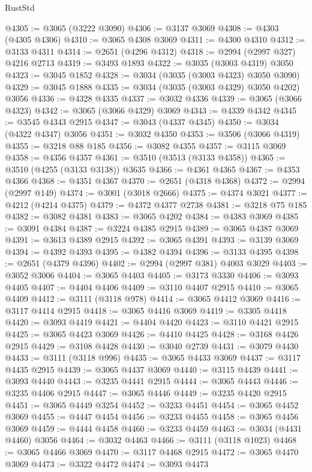 \begin{lexlean}{RustStd}
\begin{coremodule}
@4305 := @3065 (@3222 @3090)
@4306 := @3137 @3069
@4308 := @4303 (@4305 @4306)
@4310 := @3065 @4308 @3069
@4311 := @4300 @4310
@4312 := @3133 @4311
@4314 := @2651 (@4296 @4312)
@4318 := @2994 (@2997 @327) @4216 @2713
@4319 := @3493 @1893
@4322 := @3035 (@3003 @4319) @3050
@4323 := @3045 @1852
@4328 := @3034 (@3035 (@3003 @4323) @3050 @3090)
@4329 := @3045 @1888
@4335 := @3034 (@3035 (@3003 @4329) @3050 @4202) @3056
@4336 := @4328 @4335
@4337 := @3032 @4336
@4339 := @3065 (@3066 @4323)
@4342 := @3065 (@3066 @4329) @3069
@4343 := @4339 @4342
@4345 := @3545 @4343 @2915
@4347 := @3043 (@4337 @4345)
@4350 := @3034 (@4322 @4347) @3056
@4351 := @3032 @4350
@4353 := @3506 (@3066 @4319)
@4355 := @3218 @88 @185
@4356 := @3082 @4355
@4357 := @3115 @3069
@4358 := @4356 @4357
@4361 := @3510 (@3513 (@3133 @4358))
@4365 := @3510 (@4255 (@3133 @3138)) @3635
@4366 := @4361 @4365
@4367 := @4353 @4366
@4368 := @4351 @4367
@4370 := @2651 (@4318 @4368)
@4372 := @2994 (@2997 @149)
@4374 := @3001 (@3018 @2666)
@4375 := @4374 @3021
@4377 := @4212 (@4214 @4375)
@4379 := @4372 @4377 @2738
@4381 := @3218 @75 @185
@4382 := @3082 @4381
@4383 := @3065 @4202
@4384 := @4383 @3069
@4385 := @3091 @4384
@4387 := @3224 @4385 @2915
@4389 := @3065 @4387 @3069
@4391 := @3613 @4389 @2915
@4392 := @3065 @4391
@4393 := @3139 @3069
@4394 := @4392 @4393
@4395 := @4382 @4394
@4396 := @3133 @4395
@4398 := @2651 (@4379 @4396)
@4402 := @2994 (@2997 @381) @4003 @3029
@4403 := @3052 @3006
@4404 := @3065 @4403
@4405 := @3173 @3330
@4406 := @3093 @4405
@4407 := @4404 @4406
@4409 := @3110 @4407 @2915
@4410 := @3065 @4409
@4412 := @3111 (@3118 @978)
@4414 := @3065 @4412 @3069
@4416 := @3117 @4414 @2915
@4418 := @3065 @4416 @3069
@4419 := @3305 @4418
@4420 := @3093 @4419
@4421 := @4404 @4420
@4423 := @3110 @4421 @2915
@4425 := @3065 @4423 @3069
@4426 := @4410 @4425
@4428 := @3168 @4426 @2915
@4429 := @3108 @4428
@4430 := @3040 @2739
@4431 := @3079 @4430
@4433 := @3111 (@3118 @996)
@4435 := @3065 @4433 @3069
@4437 := @3117 @4435 @2915
@4439 := @3065 @4437 @3069
@4440 := @3115 @4439
@4441 := @3093 @4440
@4443 := @3235 @4441 @2915
@4444 := @3065 @4443
@4446 := @3235 @4406 @2915
@4447 := @3065 @4446
@4449 := @3235 @4420 @2915
@4451 := @3065 @4449 @3254
@4452 := @3233 @4451
@4454 := @3065 @4452 @3069
@4455 := @4447 @4454
@4456 := @3233 @4455
@4458 := @3065 @4456 @3069
@4459 := @4444 @4458
@4460 := @3233 @4459
@4463 := @3034 (@4431 @4460) @3056
@4464 := @3032 @4463
@4466 := @3111 (@3118 @1023)
@4468 := @3065 @4466 @3069
@4470 := @3117 @4468 @2915
@4472 := @3065 @4470 @3069
@4473 := @3322 @4472
@4474 := @3093 @4473

\end{coremodule}
\end{lexlean}
